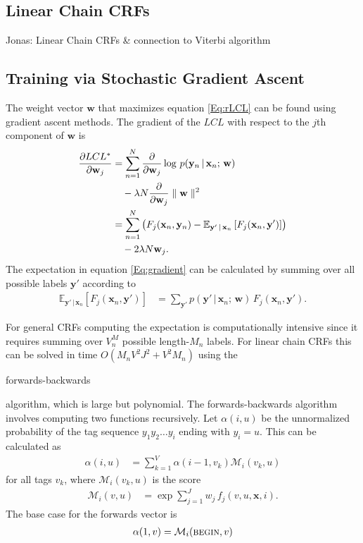 \documentclass[10pt,twocolumn,letterpaper]{article}
\newcommand{\x}{\mathbf{x}}
\newcommand{\y}{\mathbf{y}}
\newcommand{\w}{\mathbf{w}}
\begin{document}
\subsection{Linear Chain CRFs}
Jonas: Linear Chain CRFs \& connection to Viterbi algorithm


\subsection{Training via Stochastic Gradient Ascent}
The weight vector $\w$ that maximizes equation \ref{Eq:rLCL} can be found using gradient ascent methods. The gradient of the $LCL$ with respect to the $j$th component of $\w$ is
\begin{align}
	\frac{\partial LCL^*}{\partial \w_j } &= 
		\sum_{n=1}^N \frac{\partial}{\partial \w_j }  \log\,p(\y_n\,|\,\x_n ;\,\w)  \notag \\
	&\hspace{1 em} - \lambda N  \frac{\partial}{\partial \w_j }\parallel \w \parallel^2 \\
	&= \sum_{n=1}^N \left( F_j(\x_n,\y_n) -   \mathbb{E}_{\y'\,|\,\x_n} \left[ F_j(\x_n, \y' ) \right] \right)  \notag \\
	&\hspace{1 em} 	- 2 \lambda N   \w_{j}. \label{Eq:gradient}
\end{align}
The expectation in equation \ref{Eq:gradient} can be calculated by summing over all possible labels $\y'$ according to
\begin{align}
	\mathbb{E}_{\y'\,|\,\x_n} \left[ F_j(\x_n, \y' ) \right] &= \sum_{\y'} p(\y'\,|\,\x_n ;\,\w)\,F_j(\x_n, \y' ). \label{Eq:expectation}
\end{align}

\newcommand{\M}{\mathcal{M}}

For general CRFs computing the expectation is computationally intensive since it requires summing over $V^M_n$ possible length-$M_n$ labels. For linear chain CRFs this can be solved in time $O(M_n V^2 J^2 + V^2 M_n)$ using the 
\begin{em}forwards-backwards\end{em}
algorithm, which is large but polynomial. The forwards-backwards algorithm involves computing two functions recursively. Let $\alpha(i,u)$ be the unnormalized  probability of the tag sequence $y_1 y_2 \dots y_i$ ending with $y_i  = u$. This can be calculated as
\begin{align}
	\alpha(i,u) &= \sum_{k=1}^V \alpha(i-1, v_k) \M_i(v_k,u)
\end{align}
for all tags $v_k$, where $\M_i(v_k,u)$ is the score
\begin{align}
	\M_i(v,u) &= \exp \sum_{j=1}^J w_j\, f_j(v,u,\x,i).
\end{align}
The base case for the forwards vector is
\begin{align}
	\alpha(1,v) = \M_i(\mbox{\textsc{begin}},v)
\end{align}
\end{document}
